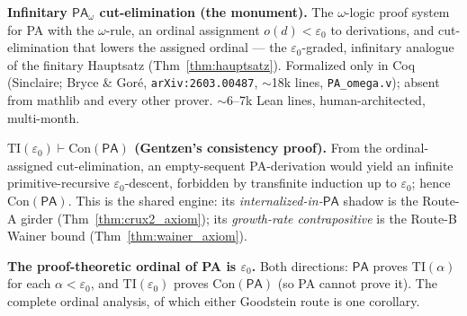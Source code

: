 \begin{theorem}\label{thm:infinitary_tower}
  \notready
\textbf{Infinitary \(\mathsf{PA}_\omega\) cut-elimination (the monument).}  The \(\omega\)-logic
proof system for PA with the \(\omega\)-rule, an ordinal assignment \(o(d)<\varepsilon_0\) to derivations,
and cut-elimination that lowers the assigned ordinal --- the \(\varepsilon_0\)-graded, infinitary
analogue of the finitary Hauptsatz (Thm~\ref{thm:hauptsatz}).  Formalized only in Coq
(Sinclaire; Bryce \& Goré, \texttt{arXiv:2603.00487}, \(\sim\)18k lines, \texttt{PA\_omega.v}); absent
from mathlib and every other prover.  \(\sim\)6--7k Lean lines, human-architected, multi-month.
\end{theorem}

\begin{theorem}\label{thm:gentzen_conpa}
  \notready
\textbf{\(\mathrm{TI}(\varepsilon_0)\vdash\mathrm{Con}(\mathsf{PA})\) (Gentzen's consistency proof).}
From the ordinal-assigned cut-elimination, an empty-sequent PA-derivation would yield an infinite
primitive-recursive \(\varepsilon_0\)-descent, forbidden by transfinite induction up to
\(\varepsilon_0\); hence \(\mathrm{Con}(\mathsf{PA})\).  This is the shared engine: its
\emph{internalized-in-\(\mathsf{PA}\)} shadow is the Route-A girder (Thm~\ref{thm:crux2_axiom}); its
\emph{growth-rate contrapositive} is the Route-B Wainer bound (Thm~\ref{thm:wainer_axiom}).
\end{theorem}

\begin{theorem}\label{thm:two_sided}
  \notready
\textbf{The proof-theoretic ordinal of PA is \(\varepsilon_0\).}  Both directions:
\(\mathsf{PA}\) proves \(\mathrm{TI}(\alpha)\) for each \(\alpha<\varepsilon_0\), and
\(\mathrm{TI}(\varepsilon_0)\) proves \(\mathrm{Con}(\mathsf{PA})\) (so PA cannot prove it).  The complete
ordinal analysis, of which either Goodstein route is one corollary.
\end{theorem}

